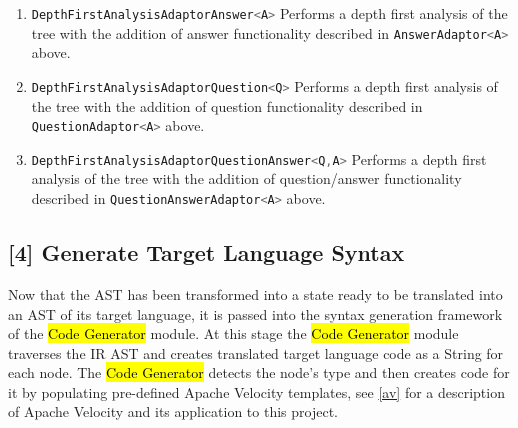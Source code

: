\begin{enumerate}
		\item \lstinline[language=Java]{DepthFirstAnalysisAdaptorAnswer<A>} Performs a depth first analysis of the tree with the addition of answer functionality described in  \lstinline[language=Java]{AnswerAdaptor<A>} above.
		\item \lstinline[language=Java]{DepthFirstAnalysisAdaptorQuestion<Q>} Performs a depth first analysis of the tree with the addition of question functionality described in  \lstinline[language=Java]{QuestionAdaptor<A>} above.
		\item \lstinline[language=Java]{DepthFirstAnalysisAdaptorQuestionAnswer<Q,A>} Performs a depth first analysis of the tree with the addition of question/answer functionality described in  \lstinline[language=Java]{QuestionAnswerAdaptor<A>} above.
	\end{enumerate} 


	\subsection{	[4] Generate Target Language Syntax}
	Now that the AST has been transformed into a state ready to be translated into an AST of its target language, it is passed into the syntax generation framework of the \ttfamily\hl{Code Generator} \rmfamily module. At this stage the \ttfamily\hl{Code Generator} \rmfamily module traverses the IR AST and creates translated target language code as a String for each node. The \ttfamily\hl{Code Generator} \rmfamily detects the node's type and then creates code for it by populating pre-defined Apache Velocity templates, see \ref{av} for a description of Apache Velocity and its application to this project.
